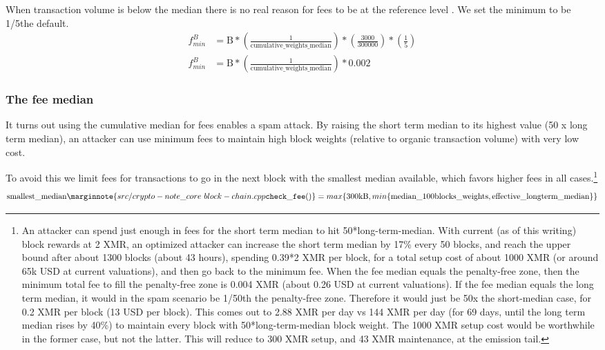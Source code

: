 When transaction volume is below the median there is no real reason for fees to be at the reference level \cite{jollymore-old-analysis}. We set the minimum to be 1/5\nth the default.\vspace{.175cm}
\begin{align*}
    f^{B}_{min} &= \textrm{B}*(\frac{1}{\textrm{cumulative\_weights\_median}}) * (\frac{3000}{300000}) * (\frac{1}{5})\\
    f^{B}_{min} &= \textrm{B}*(\frac{1}{\textrm{cumulative\_weights\_median}}) * 0.002
\end{align*}{}

\subsubsection*{The fee median}

It turns out using the cumulative median for fees enables a spam attack. By raising the short term median to its highest value (50 x long term median), an attacker can use minimum fees to maintain high block weights (relative to organic transaction volume) with very low cost.

To avoid this we limit fees for transactions to go in the next block with the smallest median available, which favors higher fees in all cases.\footnote{An attacker can spend just enough in fees for the short term median to hit 50*long-term-median. With current (as of this writing) block rewards at 2 XMR, an optimized attacker can increase the short term median by 17\% every 50 blocks, and reach the upper bound after about 1300 blocks (about 43 hours), spending 0.39*2 XMR per block, for a total setup cost of about 1000 XMR (or around 65k USD at current valuations), and then go back to the minimum fee. When the fee median equals the penalty-free zone, then the minimum total fee to fill the penalty-free zone is 0.004 XMR (about 0.26 USD at current valuations). If the fee median equals the long term median, it would in the spam scenario be 1/50th the penalty-free zone. Therefore it would just be 50x the short-median case, for 0.2 XMR per block (13 USD per block). This comes out to 2.88 XMR per day vs 144 XMR per day (for 69 days, until the long term median rises by 40\%) to maintain every block with 50*long-term-median block weight. The 1000 XMR setup cost would be worthwhile in the former case, but not the latter. This will reduce to 300 XMR setup, and 43 XMR maintenance, at the emission tail.}\vspace{.1cm}
\[\textrm{smallest\_median}\marginnote{src/crypto- note\_core\ block- chain.cpp {\tt check\_fee()}} = max\{\textrm{300kB}, min\{\textrm{median\_100blocks\_weights}, \textrm{effective\_longterm\_median}\}\}\]

